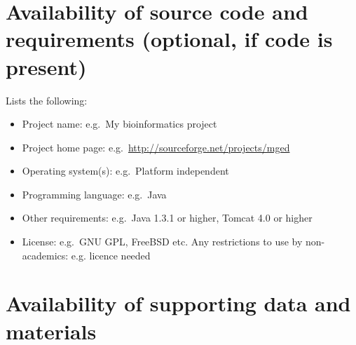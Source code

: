 \documentclass[a4paper,num-refs]{oup-contemporary}
\begin{document}


\section{Availability of source code and requirements (optional, if code is present)}

Lists the following:
\begin{itemize}
\item Project name: e.g.~My bioinformatics project
\item Project home page: e.g.~\url{http://sourceforge.net/projects/mged}
\item Operating system(s): e.g.~Platform independent
\item Programming language: e.g.~Java
\item Other requirements: e.g.~Java 1.3.1 or higher, Tomcat 4.0 or higher
\item License: e.g.~GNU GPL, FreeBSD etc.
Any restrictions to use by non-academics: e.g. licence needed
\end{itemize}


\section{Availability of supporting data and materials}

\end{document}

